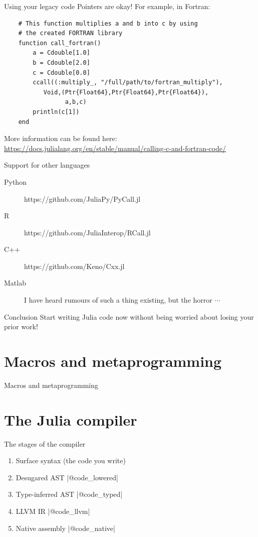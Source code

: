 \documentclass{beamer}
\begin{document}
\begin{frame}[fragile]{Using your legacy code}
Pointers are okay! For example, in Fortran:

\begin{lstlisting}
    # This function multiplies a and b into c by using 
    # the created FORTRAN library
    function call_fortran()
        a = Cdouble[1.0]
        b = Cdouble[2.0]
        c = Cdouble[0.0]
        ccall((:multiply_, "/full/path/to/fortran_multiply"),
           Void,(Ptr{Float64},Ptr{Float64},Ptr{Float64}),
                 a,b,c)
        println(c[1])
    end
\end{lstlisting}

\pause
More information can be found here: \url{https://docs.julialang.org/en/stable/manual/calling-c-and-fortran-code/}
\end{frame}
\begin{frame}{Support for other languages}
  \begin{description}
    \item[Python] https://github.com/JuliaPy/PyCall.jl
    \item[R] https://github.com/JuliaInterop/RCall.jl
    \item[C++] https://github.com/Keno/Cxx.jl
    \item[Matlab] I have heard rumours of such a thing existing, but the horror $\cdots$
  \end{description}
  \begin{block}{Conclusion}
    Start writing Julia code now without being worried about losing your prior work!
  \end{block}
\end{frame}

\section{Macros and metaprogramming}
\begin{frame}{Macros and metaprogramming}
\end{frame}
\section{The Julia compiler}
\begin{frame}[fragile]{The stages of the compiler}
  \begin{enumerate}
    \item Surface syntax (the code you write)
    \item Desugared AST |@code\_lowered| 
    \item Type-inferred AST |@code\_typed|
    \item LLVM IR |@code\_llvm|
    \item Native assembly |@code\_native|
  \end{enumerate}
\end{frame}
\end{document}
